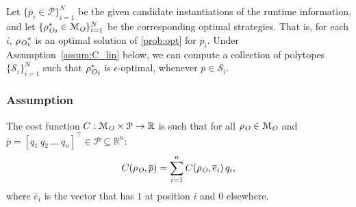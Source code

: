 Let $\{\overline{p}_i\in \mathcal{P}\}^{N}_{i=1}$ be the given candidate instantiations of the runtime information, and let 
$\{{\rho_{\textit{O}}^\ast}_i\in \mathcal{M}_{\textit{O}}\}_{i=1}^{N}$ be the corresponding optimal strategies. That is, for each $i$, ${\rho_{\textit{O}}}_i^\ast$ is an optimal solution of \eqref{prob:opt} for $\overline{p}_i$. 
Under Assumption~\ref{assum:C_lin} below, we can compute a collection of polytopes ${\{\mathcal{S}_i\}}_{i=1}^N$ such that ${\rho_{\textit{O}}^\ast}_i$ is $\epsilon$-optimal, whenever $\overline p \in \mathcal{S}_i$.
\subsubsection*{Assumption}\label{assum:C_lin}
  The cost function $C: \mathcal M_{\textit{O}}\times \mathcal{P}
  \to \mathbb{R}$ is such that for all $\rho_{\textit{O}} \in \mathcal M_{\textit{O}}$ and $\overline p = {[q_1\ q_2\ \ldots\ q_n]}^\top \in \mathcal P \subseteq \mathbb{R}^n$:
  \begin{align}
        C(\rho_{\textit{O}}, \overline{p}) = \sum_{i=1}^n
        C(\rho_{\textit{O}}, \overline{e}_i)\, q_i,\label{eq:V_lin_decompose}
    \end{align}
    where $\overline{e}_i$ is the vector that has $1$ at
     position $i$ and $0$ elsewhere.


